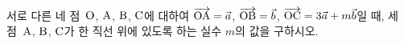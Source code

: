 서로 다른 네 점~$\mathrm{O}$, $\mathrm{A}$, $\mathrm{B}$, $\mathrm{C}$에 대하여 $\overrightarrow{\mathrm{OA}}=\vec{a}$, $\overrightarrow{\mathrm{OB}}=\vec{b}$, $\overrightarrow{\mathrm{OC}}=3\vec{a}+m\vec{b}$일 때, 세 점~$\mathrm{A}$, $\mathrm{B}$, $\mathrm{C}$가 한 직선 위에 있도록 하는 실수 $m$의 값을 구하시오. 
